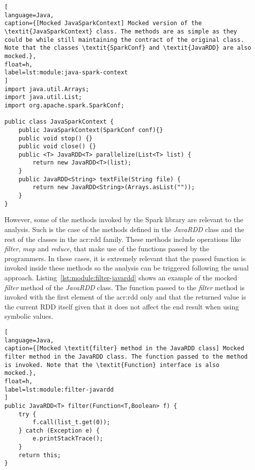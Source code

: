 \begin{lstlisting}[
language=Java,
caption={[Mocked JavaSparkContext] Mocked version of the \textit{JavaSparkContext} class. The methods are as simple as they could be while still maintaining the contract of the original class. Note that the classes \textit{SparkConf} and \textit{JavaRDD} are also mocked.},
float=h,
label=lst:module:java-spark-context
]
import java.util.Arrays;
import java.util.List;
import org.apache.spark.SparkConf;

public class JavaSparkContext {	
	public JavaSparkContext(SparkConf conf){}
	public void stop() {}	
	public void close() {}
	public <T> JavaRDD<T> parallelize(List<T> list) {		
		return new JavaRDD<T>(list);
	}
	public JavaRDD<String> textFile(String file) {
		return new JavaRDD<String>(Arrays.asList(""));
	}
}
\end{lstlisting}

However, some of the methods invoked by the Spark library are relevant to the analysis. Such is the case of the methods defined in the \textit{JavaRDD} class and the rest of the classes in the \acrshort{acr:rdd} family. These methods include operations like \textit{filter}, \textit{map} and \textit{reduce}, that make use of the functions passed by the programmers. In these cases, it is extremely relevant that the passed function is invoked inside these methods so the analysis can be triggered following the usual \spf approach. Listing~\ref{lst:module:filter-javardd} shows an example of the mocked \textit{filter} method of the \textit{JavaRDD} class. The function passed to the \textit{filter} method is invoked with the first element of the \acrshort{acr:rdd} only and that the returned value is the current RDD itself given that it does not affect the end result when using symbolic values.

\begin{lstlisting}[
language=Java,
caption={[Mocked \textit{filter} method in the JavaRDD class] Mocked filter method in the JavaRDD class. The function passed to the method is invoked. Note that the \textit{Function} interface is also mocked.},
float=h,
label=lst:module:filter-javardd
]
public JavaRDD<T> filter(Function<T,Boolean> f) {		
	try {
		f.call(list_t.get(0));
	} catch (Exception e) {
		e.printStackTrace();
	}
	return this;
}
\end{lstlisting}





